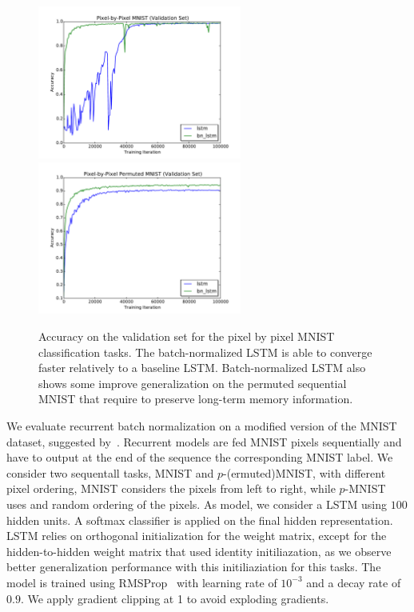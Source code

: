 \documentclass{article} %
\begin{document}
\begin{figure}
\center
\includegraphics[width=6.7cm]{figures/unpermuted_valid.pdf}
\includegraphics[width=6.7cm]{figures/permuted_valid.pdf}
\caption{Accuracy on the validation set for the pixel by pixel MNIST classification tasks. The batch-normalized LSTM is able to converge faster relatively to a baseline LSTM.
  Batch-normalized  LSTM also shows some improve generalization on the permuted sequential MNIST that require to preserve long-term memory information.}
\label{fig:seqmnist_valid}
\end{figure}


We evaluate recurrent batch normalization on a modified version of the MNIST dataset, suggested by~\cite{le2015simple}.
Recurrent models are fed MNIST pixels sequentially and have to output at the end of the sequence the corresponding MNIST label.
We consider two sequentall tasks, MNIST and $p$-(ermuted)MNIST, with different pixel ordering, MNIST considers the pixels from left to right, while $p$-MNIST uses and random ordering of the pixels.
As model, we consider a LSTM using $100$ hidden units. A softmax classifier
is applied on the final hidden representation.
LSTM relies on orthogonal initialization for the weight matrix, except for the hidden-to-hidden weight matrix that used identity initiliazation, as we observe better generalization performance with this
initiliaziation for this tasks.
The model is trained using RMSProp~\cite{Tieleman2012} with learning rate of $10^{-3}$ and a decay rate of $0.9$. We apply gradient clipping at 1 to avoid exploding gradients.
\end{document}
